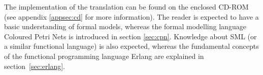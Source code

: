 The implementation of the translation can be found on the enclosed CD-ROM (see appendix \ref{appsec:cd} for more information). The reader is expected to have a basic understanding of formal models, whereas the formal modelling language Coloured Petri Nets is introduced in section \ref{sec:cpn}. Knowledge about SML (or a similar functional language) is also expected, whereas the fundamental concepts of the functional programming language Erlang are explained in section~\ref{sec:erlang}.
